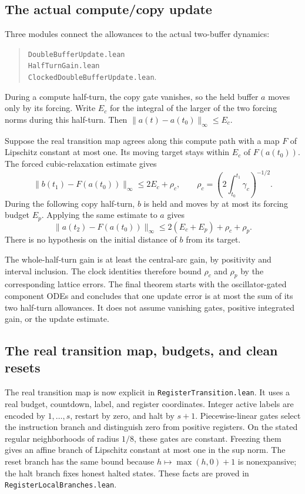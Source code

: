 \documentclass[11pt]{article}
\newcommand{\code}[1]{{\small\nolinkurl{#1}}}
\begin{document}
\subsection{The actual compute/copy update}

Three modules connect the allowances to the actual two-buffer dynamics:
\begin{quote}
\code{DoubleBufferUpdate.lean}\\
\code{HalfTurnGain.lean}\\
\code{ClockedDoubleBufferUpdate.lean}.
\end{quote}
During a compute half-turn, the copy gate vanishes,
so the held buffer $a$ moves only by its forcing. Write $E_c$ for the
integral of the larger of the two forcing norms during this half-turn.
Then $\|a(t)-a(t_0)\|_\infty\le E_c$.

Suppose the real transition map agrees along this compute path with a
map $F$ of Lipschitz constant at most one. Its moving target stays within
$E_c$ of $F(a(t_0))$. The forced cubic-relaxation estimate gives
\[
 \|b(t_1)-F(a(t_0))\|_\infty\le2E_c+\rho_c,
 \qquad \rho_c=\left(2\int_{t_0}^{t_1}\gamma_c\right)^{-1/2}.
\]
During the following copy half-turn, $b$ is held and moves by at most
its forcing budget $E_p$. Applying the same estimate to $a$ gives
\[
 \|a(t_2)-F(a(t_0))\|_\infty
 \le2(E_c+E_p)+\rho_c+\rho_p.
\]
There is no hypothesis on the initial distance of $b$ from its target.

The whole-half-turn gain is at least the central-arc gain, by positivity
and interval inclusion. The clock identities therefore bound $\rho_c$
and $\rho_p$ by the corresponding lattice errors. The final theorem
starts with the oscillator-gated component ODEs and concludes that one
update error is at most the sum of its two half-turn allowances. It does
not assume vanishing gates, positive integrated gain, or the update
estimate.

\subsection{The real transition map, budgets, and clean resets}

The real transition map is now explicit in
\code{RegisterTransition.lean}. It uses a real budget, countdown, label,
and register coordinates. Integer active labels are encoded by
$1,\ldots,s$, restart by zero, and halt by $s+1$. Piecewise-linear gates
select the instruction branch and distinguish zero from positive
registers. On the stated regular neighborhoods of radius $1/8$, these
gates are constant. Freezing them gives an affine branch of Lipschitz
constant at most one in the sup norm. The reset branch has the same
bound because $h\mapsto\max(h,0)+1$ is nonexpansive; the halt branch
fixes honest halted states. These facts are proved in
\code{RegisterLocalBranches.lean}.
\end{document}
